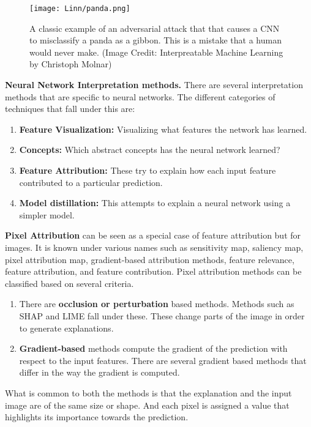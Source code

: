 \documentclass{../template/texnote}
\begin{document}
\begin{figure}[htpb]
    \centering
    \texttt{[image: Linn/panda.png]}
    \caption{A classic example of an adversarial attack that that causes a CNN to misclassify a panda as a gibbon. This is a mistake that a human would never make. (Image Credit: Interpreatable Machine Learning by Christoph Molnar)}
    \label{fig:panda}
\end{figure}



\textbf{Neural Network Interpretation methods.} There are several interpretation methods that are specific to neural networks. 
The different categories of techniques that fall under this are:
\begin{enumerate}
    \item \textbf{Feature Visualization:} Visualizing what features the network has learned.
    \item \textbf{Concepts:} Which abstract concepts has the neural network learned?
    \item \textbf{Feature Attribution:} These try to explain how each input feature contributed to a particular prediction.
    \item \textbf{Model distillation:} This attempts to explain a neural network using a simpler model.
\end{enumerate}

\textbf{Pixel Attribution} can be seen as a special case of feature attribution but for images.
It is known under various names such as sensitivity map, saliency map, pixel attribution map, gradient-based attribution methods, feature relevance, feature attribution, and feature contribution.
Pixel attribution methods can be classified based on several criteria.
\begin{enumerate}
    \item  There are \textbf{occlusion or perturbation} based methods. Methods such as SHAP and LIME fall under these.
These change parts of the image in order to generate explanations.
\item  \textbf{Gradient-based} methods compute the gradient of the prediction with respect to the input features.
There are several gradient based methods that differ in the way the gradient is computed.

\end{enumerate}
What is common to both the methods is that the explanation and the input image are of the same size or shape. 
And each pixel is assigned a value that highlights its importance towards the prediction.
\end{document}
